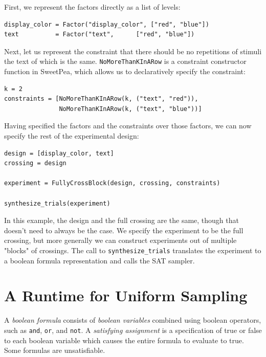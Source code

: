 First, we represent the factors directly as a list of levels:

\begin{verbatim}
display_color = Factor("display_color", ["red", "blue"])
text          = Factor("text",      ["red", "blue"])
\end{verbatim}

Next, let us represent the constraint that there should be no repetitions of stimuli the text of which is the same. \texttt{NoMoreThanKInARow} is a constraint constructor function in SweetPea, which allows us to declaratively specify the constraint:

\begin{verbatim}
k = 2
constraints = [NoMoreThanKInARow(k, ("text", "red")),
               NoMoreThanKInARow(k, ("text", "blue"))]
\end{verbatim}

Having specified the factors and the constraints over those factors, we can now specify the rest of the experimental design:

\begin{verbatim}
design = [display_color, text]
crossing = design

experiment = FullyCrossBlock(design, crossing, constraints)

synthesize_trials(experiment)
\end{verbatim}

In this example, the design and the full crossing are the same, though that doesn't need to always be the case. We specify the experiment to be the full crossing, but more generally we can construct experiments out of multiple "blocks" of crossings. The call to \texttt{synthesize\_trials} translates the experiment to a boolean formula representation and calls the SAT sampler.

\section{A Runtime for Uniform Sampling}

A \emph{boolean formula} consists of \emph{boolean variables} combined using boolean operators, such as \texttt{and}, \texttt{or}, and \texttt{not}. A \emph{satisfying assignment} is a specification of true or false to each boolean variable which causes the entire formula to evaluate to true. Some formulas are unsatisfiable.

